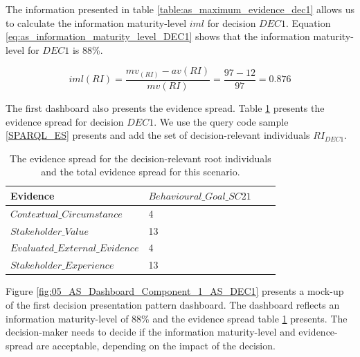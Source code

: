 The information presented in table \ref{table:as_maximum_evidence_dec1} allows us to calculate the information maturity-level $iml$ for decision $DEC1$. Equation \ref{eq:as_information_maturity_level_DEC1} shows that the information maturity-level for $DEC1$ is 88\%.

\begin{equation} \label{eq:as_information_maturity_level_DEC1}
iml(RI) = \dfrac{mv_(RI)-av(RI)}{mv(RI)} = \dfrac{97-12}{97} = 0.876
\end{equation}

The first dashboard also presents the evidence spread. Table \ref{table:as_evidence_spread_DEC1} presents the evidence spread for decision $DEC1$. We use the query code sample \ref{SPARQL_ES} presents and add the set of decision-relevant individuals $RI_{DEC1}$.

\begin{table}[H]
\centering
\caption{The evidence spread for the decision-relevant root individuals and the total evidence spread for this scenario.}
\begin{tabular}{| p{5cm} | p{4cm} |  p{4cm} |  p{2cm} | }
\hline
\rowcolor{document}
\color{documentText}Evidence &\color{documentText}$Behavioural\_Goal\_SC21$  \\
\hline
$Contextual\_Circumstance$ & 4   \\
\hdashline
$Stakeholder\_Value$ & 13  \\
\hdashline
$Evaluated\_External\_Evidence$ & 4  \\
\hdashline
$Stakeholder\_Experience$ & 13  \\
\hline
\end{tabular}
\label{table:as_evidence_spread_DEC1}
\end{table}

Figure \ref{fig:05_AS_Dashboard_Component_1_AS_DEC1} presents a mock-up of the first decision presentation pattern dashboard. The dashboard reflects an information maturity-level of 88\% and the evidence spread table \ref{table:as_evidence_spread_DEC1} presents. The decision-maker needs to decide if the information maturity-level and evidence-spread are acceptable, depending on the impact of the decision.

